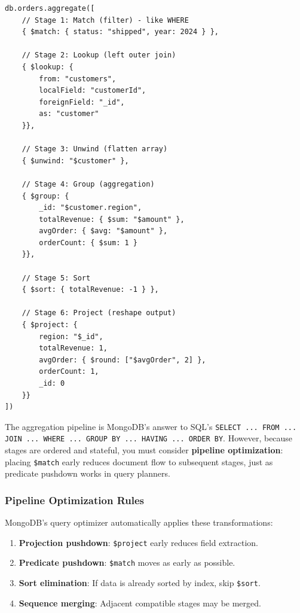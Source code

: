 \documentclass[12pt,a4paper]{article}
\begin{document}
\begin{lstlisting}[language=MongoDB, caption={Aggregation Pipeline Example}]
db.orders.aggregate([
    // Stage 1: Match (filter) - like WHERE
    { $match: { status: "shipped", year: 2024 } },

    // Stage 2: Lookup (left outer join)
    { $lookup: {
        from: "customers",
        localField: "customerId",
        foreignField: "_id",
        as: "customer"
    }},

    // Stage 3: Unwind (flatten array)
    { $unwind: "$customer" },

    // Stage 4: Group (aggregation)
    { $group: {
        _id: "$customer.region",
        totalRevenue: { $sum: "$amount" },
        avgOrder: { $avg: "$amount" },
        orderCount: { $sum: 1 }
    }},

    // Stage 5: Sort
    { $sort: { totalRevenue: -1 } },

    // Stage 6: Project (reshape output)
    { $project: {
        region: "$_id",
        totalRevenue: 1,
        avgOrder: { $round: ["$avgOrder", 2] },
        orderCount: 1,
        _id: 0
    }}
])
\end{lstlisting}

\begin{rdbmsnote}
The aggregation pipeline is MongoDB's answer to SQL's \texttt{SELECT ... FROM ... JOIN ... WHERE ... GROUP BY ... HAVING ... ORDER BY}. However, because stages are ordered and stateful, you must consider \textbf{pipeline optimization}: placing \texttt{\$match} early reduces document flow to subsequent stages, just as predicate pushdown works in query planners.
\end{rdbmsnote}

\subsubsection{Pipeline Optimization Rules}

MongoDB's query optimizer automatically applies these transformations:
\begin{enumerate}[noitemsep]
    \item \textbf{Projection pushdown}: \texttt{\$project} early reduces field extraction.
    \item \textbf{Predicate pushdown}: \texttt{\$match} moves as early as possible.
    \item \textbf{Sort elimination}: If data is already sorted by index, skip \texttt{\$sort}.
    \item \textbf{Sequence merging}: Adjacent compatible stages may be merged.
\end{enumerate}
\end{document}
